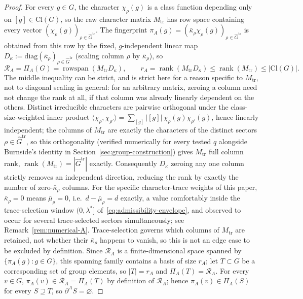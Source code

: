 \documentclass[11pt,a4paper]{article}
\theoremstyle{plain}
\theoremstyle{definition}
\theoremstyle{remark}
\newcommand{\Cl}{\mathrm{Cl}}
\newcommand{\rank}{\operatorname{rank}}
\newcommand{\adm}{\mathrm{tr}}
\newcommand{\Gadm}{\widehat{G}^{\adm}}
\newcommand{\Madm}{M_{\adm}}
\newcommand{\PiA}{\Pi_A}
\newcommand{\dA}{\partial^A}
\newcommand{\kap}{\bar\kappa_\rho}
\newcommand{\mubar}{\bar\mu_\rho}
\DeclareMathOperator{\rowspan}{rowspan}
\newcommand{\piA}{\pi_A}
\begin{document}
      \begin{proof}
        For every $g \in G$, the character $\chi_\rho(g)$ is a class function depending only on
        $[g] \in \Cl(G)$, so the raw character matrix $\Madm$ has row space containing every vector
        $(\chi_\rho(g))_{\rho \in \Gadm}$.
        The fingerprint $\piA(g) = (\kap \chi_\rho(g))_{\rho \in \Gadm}$ is obtained from this row by
        the fixed, $g$-independent linear map $D_\kappa := \mathrm{diag}(\kap)_{\rho \in \Gadm}$
        (scaling column $\rho$ by $\kap$), so
        \begin{equation}
          \label{eq:PA-def}
          \mathcal{R}_A = \PiA(G) = \rowspan(\Madm D_\kappa),
          \qquad
          r_A = \rank(\Madm D_\kappa) \le \rank(\Madm) \le |\Cl(G)|.
        \end{equation}
        The middle inequality can be strict, and is strict here for a reason specific to $\Madm$, not
        to diagonal scaling in general: for an arbitrary matrix, zeroing a column need not change the
        rank at all, if that column was already linearly dependent on the others.
        Distinct irreducible characters are pairwise orthogonal under the class-size-weighted inner
        product $\langle \chi_\rho, \chi_{\rho'}\rangle = \sum_{[g]} |[g]|\,\chi_\rho(g)\chi_{\rho'}(g)$,
        hence linearly independent; the columns of $\Madm$ are exactly the characters of the distinct
        sectors $\rho \in \Gadm$, so this orthogonality (verified numerically for every tested $q$
        alongside Burnside's identity in Section~\ref{sec:group-construction}) gives $\Madm$ full
        column rank, $\rank(\Madm) = |\Gadm|$ exactly.
        Consequently $D_\kappa$ zeroing any one column strictly removes an independent direction,
        reducing the rank by exactly the number of zero-$\kap$ columns.
        For the specific character-trace weights of this paper, $\kap = 0$ means $\mubar = 0$, i.e.\
        $d-\mubar = d$ exactly, a value comfortably inside the trace-selection window $(0,\lambda^*]$
        of~\eqref{eq:admissibility-envelope}, and observed to occur for several trace-selected
        sectors simultaneously; see Remark~\ref{rem:numerical-A}.
        Trace-selection governs which columns of $\Madm$ are retained, not whether their $\kap$
        happens to vanish, so this is not an edge case to be excluded by definition.
        Since $\mathcal{R}_A$ is a finite-dimensional space spanned by $\{\piA(g) : g \in G\}$, this
        spanning family contains a basis of size $r_A$; let $T \subset G$ be a corresponding set of
        group elements, so $|T| = r_A$ and $\PiA(T) = \mathcal{R}_A$.
        For every $v \in G$, $\piA(v) \in \mathcal{R}_A = \PiA(T)$ by definition of $\mathcal{R}_A$;
        hence $\piA(v) \in \PiA(S)$ for every $S \supseteq T$, so $\dA S = \varnothing$.
      \end{proof}
\end{document}

